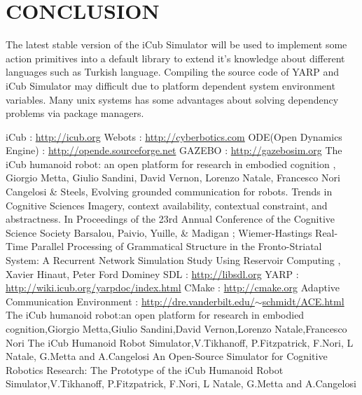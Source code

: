 \documentclass[12pt]{report}
\begin{document}
\chapter{CONCLUSION}
The latest stable version of the iCub Simulator will be used to implement some action primitives into a default library to extend it's knowledge about different languages such as Turkish language. Compiling the source code of YARP and iCub Simulator may difficult due to platform dependent system environment variables. Many unix systems has some advantages about solving dependency problems via package managers.

\begin{thebibliography}{9}
iCub : \underline{http://icub.org}
Webots : \underline{http://cyberbotics.com}
ODE(Open Dynamics Engine) : \underline{http://opende.sourceforge.net}
GAZEBO : \underline{http://gazebosim.org}
The iCub humanoid robot:
an open platform for research in embodied cognition , Giorgio Metta, Giulio Sandini, David Vernon, Lorenzo Natale, Francesco Nori
Cangelosi \& Steels, Evolving grounded communication for robots. Trends in Cognitive Sciences
Imagery, context availability,
contextual constraint, and abstractness. In Proceedings of the 23rd Annual Conference of the Cognitive Science Society Barsalou, Paivio, Yuille, \& Madigan ; Wiemer-Hastings
Real-Time Parallel Processing of Grammatical Structure in the Fronto-Striatal System: A Recurrent Network Simulation Study Using Reservoir Computing , Xavier Hinaut, Peter Ford Dominey
SDL : \underline{http://libsdl.org}
YARP : \underline{http://wiki.icub.org/yarpdoc/index.html}
CMake : \underline{http://cmake.org} 
Adaptive Communication Environment : \underline{http://dre.vanderbilt.edu/$\sim$schmidt/ACE.html}
The iCub humanoid robot:an open platform for research in embodied cognition,Giorgio Metta,Giulio Sandini,David Vernon,Lorenzo Natale,Francesco Nori
The iCub Humanoid Robot Simulator,V.Tikhanoff, P.Fitzpatrick, F.Nori, L Natale, G.Metta and A.Cangelosi
An Open-Source Simulator for Cognitive Robotics Research: The Prototype of the iCub Humanoid Robot Simulator,V.Tikhanoff, P.Fitzpatrick, F.Nori, L Natale, G.Metta and A.Cangelosi
\end{thebibliography}
\newpage
\end{document}
